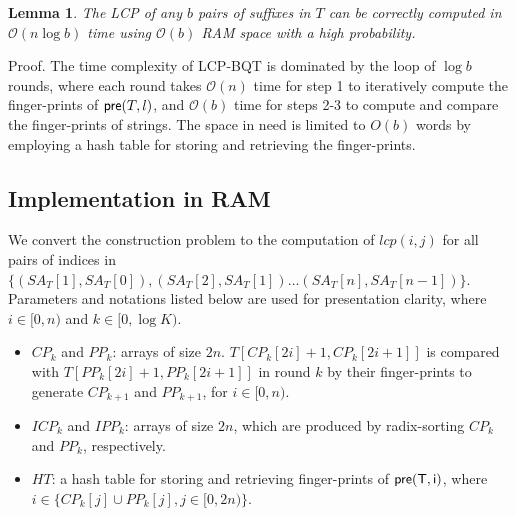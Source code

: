 \documentclass{llncs}
\newtheorem{lem}{Lemma}
\begin{document}
\begin{lem}
\label{thm:lcp:naive}
The {LCP} of any $b$ pairs of suffixes in $T$ can be correctly computed in $\mathcal{O}(n\log b)$ time using $\mathcal{O}(b)$ {RAM} space with a high probability.
\end{lem}
Proof. The time complexity of {LCP-BQT} is dominated by the loop of $\log b$ rounds, where each round takes $\mathcal{O}(n)$ time for step 1 to iteratively compute the finger-prints of ${\sf pre}(T,l)$, and $\mathcal{O}(b)$ time for steps 2-3 to compute and compare the finger-prints of strings. The space in need is limited to $O(b)$ words by employing a hash table for storing and  retrieving the finger-prints.


\subsection{Implementation in RAM}\label{subsec:implementation_in_ram}

We convert the construction problem to the computation of $lcp(i,j)$ for all pairs of indices in $\{(SA_T[1], SA_T[0]),(SA_T[2], SA_T[1])\ldots (SA_T[n], SA_T[n-1])\}$. Parameters and notations listed below are used for presentation clarity, where $i\in [0,n)$ and $k\in [0,\log K)$.

\begin{itemize}
\item $CP_k$ and $PP_k$: arrays of size $2n$. $T[CP_k[2i]+1,CP_k[2i+1]]$ is compared with $T[PP_k[2i]+1,PP_k[2i+1]]$ in round $k$ by their finger-prints to generate $CP_{k+1}$ and $PP_{k+1}$, for $i\in [0,n)$.
\item $ICP_k$ and $IPP_k$: arrays of size $2n$, which are produced by radix-sorting $CP_k$ and $PP_k$, respectively.
\item $HT$: a hash table for storing and retrieving finger-prints of ${\sf pre(T,i)}$, where $i\in \{CP_k[j] \cup PP_k[j], j\in[0,2n)\}$.
\end{itemize}
\end{document}
